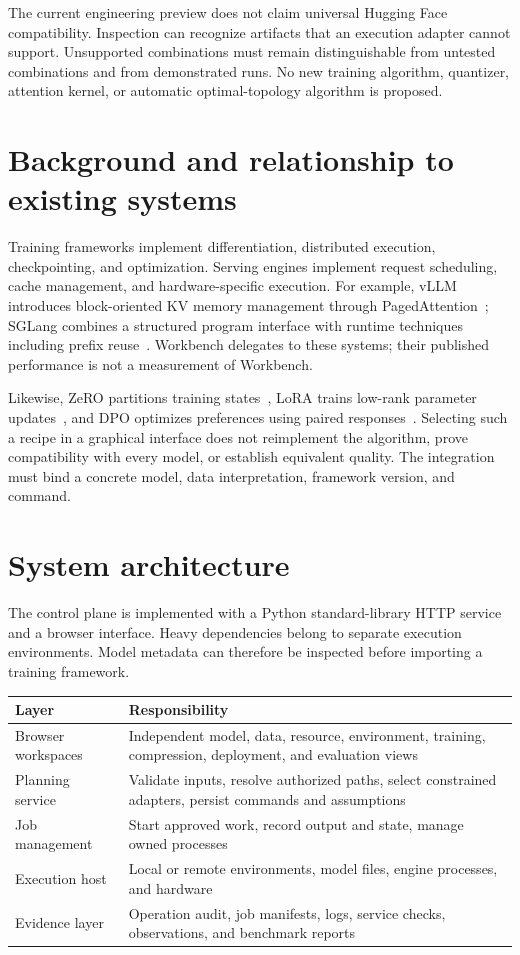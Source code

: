 \documentclass[10pt]{article}
\begin{document}
The current engineering preview does not claim universal Hugging Face compatibility. Inspection can recognize artifacts that an execution adapter cannot support. Unsupported combinations must remain distinguishable from untested combinations and from demonstrated runs. No new training algorithm, quantizer, attention kernel, or automatic optimal-topology algorithm is proposed.

\section{Background and relationship to existing systems}
Training frameworks implement differentiation, distributed execution, checkpointing, and optimization. Serving engines implement request scheduling, cache management, and hardware-specific execution. For example, vLLM introduces block-oriented KV memory management through PagedAttention~\cite{vllm}; SGLang combines a structured program interface with runtime techniques including prefix reuse~\cite{sglang}. Workbench delegates to these systems; their published performance is not a measurement of Workbench.

Likewise, ZeRO partitions training states~\cite{zero}, LoRA trains low-rank parameter updates~\cite{lora}, and DPO optimizes preferences using paired responses~\cite{dpo}. Selecting such a recipe in a graphical interface does not reimplement the algorithm, prove compatibility with every model, or establish equivalent quality. The integration must bind a concrete model, data interpretation, framework version, and command.

\section{System architecture}
The control plane is implemented with a Python standard-library HTTP service and a browser interface. Heavy dependencies belong to separate execution environments. Model metadata can therefore be inspected before importing a training framework.

\begin{center}
\begin{tabularx}{\linewidth}{@{}lX@{}}
\toprule
Layer & Responsibility \\
\midrule
Browser workspaces & Independent model, data, resource, environment, training, compression, deployment, and evaluation views \\
Planning service & Validate inputs, resolve authorized paths, select constrained adapters, persist commands and assumptions \\
Job management & Start approved work, record output and state, manage owned processes \\
Execution host & Local or remote environments, model files, engine processes, and hardware \\
Evidence layer & Operation audit, job manifests, logs, service checks, observations, and benchmark reports \\
\bottomrule
\end{tabularx}
\end{center}
\end{document}
